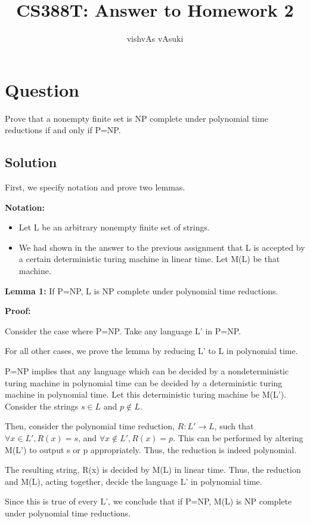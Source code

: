 \documentclass[10pt]{article}
\title{CS388T: Answer to Homework 2}
\author{vishvAs vAsuki}
\begin{document}
\maketitle

\section{Question}

Prove that a nonempty finite set is NP complete under polynomial time reductions if and only if P=NP.

\subsection{Solution}

First, we specify notation and prove two lemmas.

\textbf{Notation:}
\begin{itemize}
\item Let L be an arbitrary nonempty finite set of strings.
\item We had shown in the answer to the previous assignment that L is accepted by a certain deterministic turing machine in linear time. Let M(L) be that machine.
\end{itemize}

\textbf{Lemma 1:} If P=NP, L is NP complete under polynomial time reductions.

\textbf{Proof:}

Consider the case where P=NP. Take any language L' in P=NP.

For all other cases, we prove the lemma by reducing L' to L in polynomial time.

P=NP implies that any language which can be decided by a nondeterministic turing machine in polynomial time can be decided by a deterministic turing machine in polynomial time. Let this deterministic turing machine be M(L'). Consider the strings $s \in L$ and $p \notin L$.

Then, consider the polynomial time reduction, $R:L'\rightarrow L$, such that $\forall x \in L', R(x)=s$, and $\forall x \notin L', R(x)=p$. This can be performed by altering M(L') to output s or p appropriately. Thus, the reduction is indeed polynomial.

The resulting string, R(x) is decided by M(L) in linear time. Thus, the reduction and M(L), acting together, decide the language L' in polynomial time.

Since this is true of every L', we conclude that if P=NP, M(L) is NP complete under polynomial time reductions.
\end{document}

